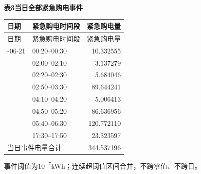 \begin{center}\textbf{表3\quad 当日全部紧急购电事件}\end{center}
\begin{longtable}{llr}\toprule 日期 & 紧急购电时间段 & 紧急购电量\\\midrule\endfirsthead
\toprule 日期 & 紧急购电时间段 & 紧急购电量\\\midrule\endhead
\bottomrule\endfoot
2025-06-21 & 00:20--00:30 & 10.332555\\
 & 02:00--02:10 & 3.137279\\
 & 02:20--02:30 & 5.684046\\
 & 02:50--03:30 & 89.644241\\
 & 04:10--04:20 & 5.006413\\
 & 04:50--05:20 & 86.636956\\
 & 05:40--06:30 & 120.772110\\
 & 17:30--17:50 & 23.323597\\
\midrule\multicolumn{2}{l}{当日事件电量合计} & 344.537196\\
\end{longtable}
\noindent 事件阈值为$10^{-7}$kWh；连续超阈值区间合并，不跨零值、不跨日。
\endgroup
\clearpage
